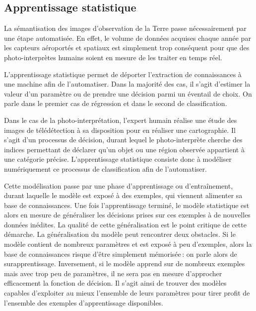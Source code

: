 \subsection{Apprentissage statistique}

La sémantisation des images d'observation de la Terre passe nécessairement par une étape automatisée. En effet, le volume de données acquises chaque année par les capteurs aéroportés et spatiaux est simplement trop conséquent pour que des photo-interprètes humains soient en mesure de les traiter en temps réel.

L'apprentissage statistique permet de déporter l'extraction de connaissances à une machine afin de l'automatiser. Dans la majorité des cas, il s'agit d'estimer la valeur d'un paramètre ou de prendre une décision parmi un éventail de choix. On parle dans le premier cas de régression et dans le second de classification.

Dans le cas de la photo-interprétation, l'expert humain réalise une étude des images de télédétection à sa disposition pour en réaliser une cartographie. Il s'agit d'un processus de décision, durant lequel le photo-interprète cherche des indices permettant de déclarer qu'un objet ou une région observée appartient à une catégorie précise. L'apprentissage statistique consiste donc à modéliser numériquement ce processus de classification afin de l'automatiser.

Cette modélisation passe par une phase d'apprentissage ou d'entraînement, durant laquelle le modèle est exposé à des exemples, qui viennent alimenter sa base de connaissances. Une fois l'apprentissage terminé, le modèle statistique est alors en mesure de généraliser les décisions prises sur ces exemples à de nouvelles données inédites. La qualité de cette généralisation est le point critique de cette démarche. La généralisation du modèle peut rencontrer deux obstacles. Si le modèle contient de nombreux paramètres et est exposé à peu d'exemples, alors la base de connaissances risque d'être simplement mémorisée\,: on parle alors de surapprentissage. Inversement, si le modèle apprend sur de nombreux exemples mais avec trop peu de paramètres, il ne sera pas en mesure d'approcher efficacement la fonction de décision. Il s'agit ainsi de trouver des modèles capables d'exploiter au mieux l'ensemble de leurs paramètres pour tirer profit de l'ensemble des exemples d'apprentissage disponibles.

